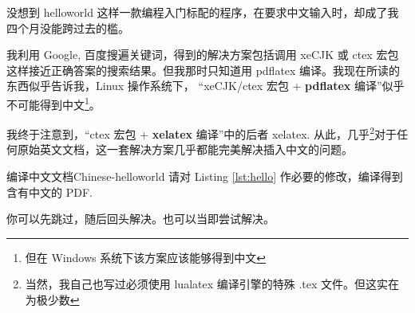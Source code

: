 没想到 helloworld 这样一款编程入门标配的程序，在要求中文输入时，却成了我四个月没能跨过去的槛。

我利用 Google, 百度搜遍关键词，得到的解决方案包括调用 xeCJK 或 ctex 宏包这样接近正确答案的搜索结果。但我那时只知道用 pdflatex 编译。我现在所读的东西似乎告诉我，Linux 操作系统下， “xeCJK/ctex 宏包 + \textbf{pdflatex} 编译”似乎不可能得到中文\footnote{但在 Windows 系统下该方案应该能够得到中文}。

我终于注意到，“ctex 宏包 + \textbf{xelatex} 编译”中的后者 xelatex. 从此，几乎\footnote{当然，我自己也写过必须使用 lualatex 编译引擎的特殊 .tex 文件。但这实在为极少数}对于任何原始英文文档，这一套解决方案几乎都能完美解决插入中文的问题。

\begin{Ex}{编译中文文档}{Chinese-helloworld}
请对 Listing \ref{lst:hello} 作必要的修改，编译得到含有中文的 PDF. \\ \myhrule

你可以先跳过，随后回头解决。也可以当即尝试解决。
\end{Ex}